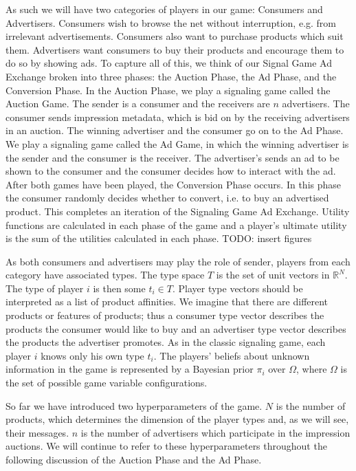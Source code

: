 \documentclass{article}
\begin{document}
As such we will have two categories of players in our game: Consumers and Advertisers. Consumers wish to browse the net without interruption, e.g. from irrelevant advertisements. Consumers also want to purchase products which suit them. Advertisers want consumers to buy their products and encourage them to do so by showing ads. To capture all of this, we think of our Signal Game Ad Exchange broken into three phases: the Auction Phase, the Ad Phase, and the Conversion Phase. In the Auction Phase, we play a signaling game called the Auction Game. The sender is a consumer and the receivers are $n$ advertisers. The consumer sends impression metadata, which is bid on by the receiving advertisers in an auction. The winning advertiser and the consumer go on to the Ad Phase. We play a signaling game called the Ad Game, in which the winning advertiser is the sender and the consumer is the receiver. The advertiser's sends an ad to be shown to the consumer and the consumer decides how to interact with the ad. After both games have been played, the Conversion Phase occurs. In this phase the consumer randomly decides whether to convert, i.e. to buy an advertised product. This completes an iteration of the Signaling Game Ad Exchange. Utility functions are calculated in each phase of the game and a player's ultimate utility is the sum of the utilities calculated in each phase. TODO: insert figures

As both consumers and advertisers may play the role of sender, players from each category have associated types. The type space $T$ is the set of unit vectors in $\mathbb{R}^N$. The type of player $i$ is then some $t_i \in T$. Player type vectors should be interpreted as a list of product affinities. We imagine that there are different products or features of products; thus a consumer type vector describes the products the consumer would like to buy and an advertiser type vector describes the products the advertiser promotes.  As in the classic signaling game, each player $i$ knows only his own type $t_i$. The players' beliefs about unknown information in the game is represented by a Bayesian prior $\pi_i$ over $\Omega$, where $\Omega$ is the set of possible game variable configurations. 

So far we have introduced two hyperparameters of the game. $N$ is the number of products, which determines the dimension of the player types and, as we will see, their messages. $n$ is the number of advertisers which participate in the impression auctions. We will continue to refer to these hyperparameters throughout the following discussion of the Auction Phase and the Ad Phase. 
\end{document}
